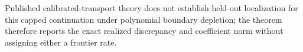 Published calibrated-transport theory does not establish held-out localization for this capped continuation under polynomial boundary depletion; the theorem therefore reports the exact realized discrepancy and coefficient norm without assigning either a frontier rate.